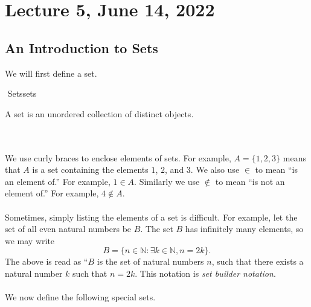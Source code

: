 \section{Lecture 5, June 14, 2022}

    \subsection{An Introduction to Sets}
    
        We will first define a set.
        \begin{definition}{\Stop\,\,Sets}{sets}
        
            A set is an unordered collection of distinct objects.
            
        \end{definition}
        \vphantom
        \\
        \\
        We use curly braces to enclose elements of sets. For example, \(A=\{1,2,3\}\) means that \(A\) is a set containing the elements \(1\), \(2\), and \(3\). We also use \(\in\) to mean ``is an element of.'' For example, \(1\in A\). Similarly we use \(\nin\) to mean ``is not an element of.'' For example, \(4\nin A\). 
        \\
        \\
        Sometimes, simply listing the elements of a set is difficult. For example, let the set of all even natural numbers be \(B\). The set \(B\) has infinitely many elements, so we may write
        \begin{equation*}
            B=\{n\in\mathbb{N}:\exists k\in\mathbb{N}, n=2k\}.
        \end{equation*}
        The above is read as ``\(B\) is the set of natural numbers \(n\), such that there exists a natural number \(k\) such that \(n=2k\). This notation is \textit{set builder notation}. 
        \pagebreak
        \\
        \\
        We now define the following special sets.
